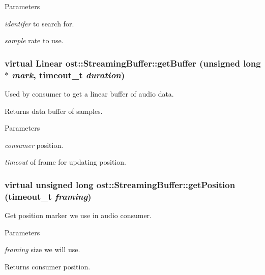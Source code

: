 \begin{DoxyParams}{Parameters}
\item[{\em identifer}]to search for. \item[{\em sample}]rate to use. \end{DoxyParams}
\subsubsection[{getBuffer}]{\setlength{\rightskip}{0pt plus 5cm}virtual Linear ost::StreamingBuffer::getBuffer (unsigned long $\ast$ {\em mark}, \/  timeout\_\-t {\em duration})\hspace{0.3cm}{\ttfamily  [virtual]}}\label{classost_1_1_streaming_buffer_a743f64a1e17a63227cc1044a960c25c1}


Used by consumer to get a linear buffer of audio data. \begin{DoxyReturn}{Returns}
data buffer of samples. 
\end{DoxyReturn}

\begin{DoxyParams}{Parameters}
\item[{\em consumer}]position. \item[{\em timeout}]of frame for updating position. \end{DoxyParams}
\subsubsection[{getPosition}]{\setlength{\rightskip}{0pt plus 5cm}virtual unsigned long ost::StreamingBuffer::getPosition (timeout\_\-t {\em framing})\hspace{0.3cm}{\ttfamily  [virtual]}}\label{classost_1_1_streaming_buffer_a5568122a2189dfc56e76c45aa007d698}


Get position marker we use in audio consumer. 
\begin{DoxyParams}{Parameters}
\item[{\em framing}]size we will use. \end{DoxyParams}
\begin{DoxyReturn}{Returns}
consumer position. 
\end{DoxyReturn}

